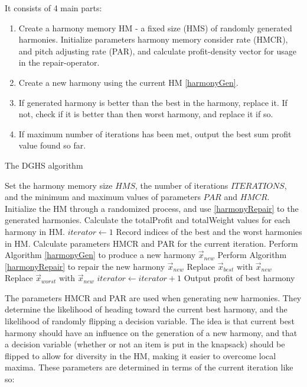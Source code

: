 \documentclass[titlepage]{article}
\begin{document}
It consists of 4 main parts:
\begin{enumerate}
    \item Create a harmony memory HM - a fixed size (HMS) of randomly generated harmonies. Initialize parameters harmony memory consider rate (HMCR), and pitch adjusting rate (PAR), and calculate profit-density vector for usage in the repair-operator.
    \item Create a new harmony using the current HM \ref{harmonyGen}.
    \item If generated harmony is better than the best in the harmony, replace it. If not, check if it is better than then worst harmony, and replace it if so. 
    \item If maximum number of iterations has been met, output the best sum profit value found so far.
\end{enumerate}

\vskip 0.5cm
\begin{breakablealgorithm}
\caption{The DGHS algorithm}\label{DGHS}
    \begin{algorithmic}[1]
        \State Set the harmony memory size $HMS$, the number of iterations $ITERATIONS$, and the minimum and maximum values of parameters $PAR$ and $HMCR$.
        \State Initialize the HM through a randomized process, and use \ref{harmonyRepair} to the generated harmonies. Calculate the totalProfit and totalWeight values for each harmony in HM.
        \State $iterator \gets 1$
            \State Record indices of the best and the worst harmonies in HM.
            \State Calculate parameters HMCR and PAR for the current iteration.
            \State Perform Algorithm \ref{harmonyGen} to produce a new harmony $\Vec{x}_{new}$
            \State Perform Algorithm \ref{harmonyRepair} to repair the new harmony $\Vec{x}_{new}$
                \State Replace $\Vec{x}_{best} \text{ with } \Vec{x}_{new}$
                \State Replace $\Vec{x}_{worst} \text{ with } \Vec{x}_{new}$
            \EndIf
            \State $iterator \gets iterator+1$
        \EndWhile
        \State Output profit of best harmony
    \end{algorithmic}
\end{breakablealgorithm}
\vskip 0.5cm

The parameters HMCR and PAR are used when generating new harmonies. They determine the likelihood of heading toward the current best harmony, and the likelihood of randomly flipping a decision variable. The idea is that current best harmony should have an influence on the generation of a new harmony, and that a decision variable (whether or not an item is put in the knapsack) should be flipped to allow for diversity in the HM, making it easier to overcome local maxima. These parameters are determined in terms of the current iteration like so:
\end{document}
